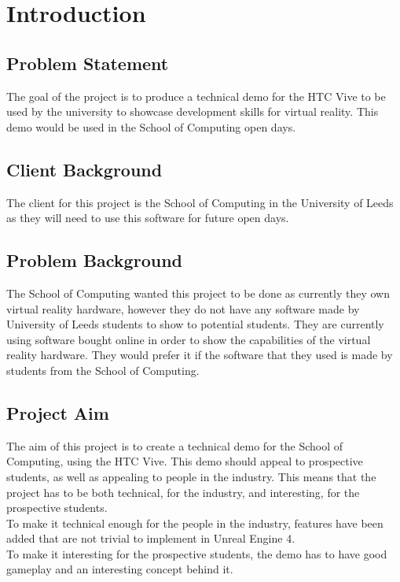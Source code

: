 \chapter{Introduction}
\label{chapter1}

\section{Problem Statement}
The goal of the project is to produce a technical demo for the HTC Vive to be used by the university to showcase development skills for virtual reality. This demo would be used in the School of Computing open days.

\section{Client Background}
The client for this project is the School of Computing in the University of Leeds as they will need to use this software for future open days.

\section{Problem Background}
The School of Computing wanted this project to be done as currently they own virtual reality hardware, however they do not have any software made by University of Leeds students to show to potential students. They are currently using software bought online in order to show the capabilities of the virtual reality hardware. They would prefer it if the software that they used is made by students from the School of Computing.


\section{Project Aim}
The aim of this project is to create a technical demo for the School of Computing, using the HTC Vive. This demo should appeal to prospective students, as well as appealing to people in the industry. This means that the project has to be both technical, for the industry, and interesting, for the prospective students.\\
To make it technical enough for the people in the industry, features have been added that are not trivial to implement in Unreal Engine 4.\\
To make it interesting for the prospective students, the demo has to have good gameplay and an interesting concept behind it.\\


